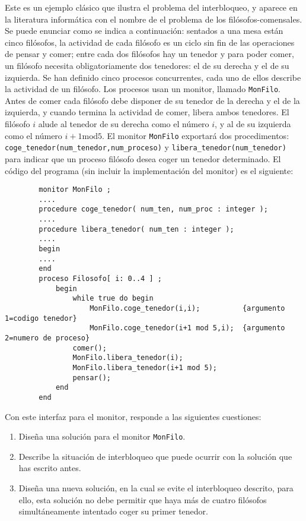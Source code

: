 \begin{ejercicio}
    Este es un ejemplo clásico que ilustra el problema del interbloqueo, y aparece en la literatura informática con el nombre de el problema de los filósofos-comensales. Se puede enunciar como se indica a continuación: sentados a una mesa están cinco filósofos, la actividad de cada filósofo es un ciclo sin fin de las operaciones de pensar y comer; entre cada dos filósofos hay un tenedor y para poder comer, un filósofo necesita obligatoriamente dos tenedores: el de su derecha y el de su izquierda. Se han definido cinco procesos concurrentes, cada uno de ellos describe la actividad de un filósofo. Los procesos usan un monitor, llamado \verb|MonFilo|. Antes de comer cada filósofo debe disponer de su tenedor de la derecha y el de la izquierda, y cuando termina la actividad de comer, libera ambos tenedores. El filósofo $i$ alude al tenedor de su derecha como el número $i$, y al de su izquierda como el número $i + 1 \text{mod} 5$. El monitor \verb|MonFilo| exportará dos procedimentos: \verb|coge_tenedor(num_tenedor,num_proceso)| y \verb|libera_tenedor(num_tenedor)| para indicar que un proceso filósofo desea coger un tenedor determinado. El código del programa (sin incluir la implementación del monitor) es el siguiente:
    \begin{verbatim}
        monitor MonFilo ;
        ....
        procedure coge_tenedor( num_ten, num_proc : integer );
        ....
        procedure libera_tenedor( num_ten : integer );
        ....
        begin
        ....
        end
        proceso Filosofo[ i: 0..4 ] ;
            begin
                while true do begin
                    MonFilo.coge_tenedor(i,i);          {argumento 1=codigo tenedor}
                    MonFilo.coge_tenedor(i+1 mod 5,i);  {argumento 2=numero de proceso}
                comer();
                MonFilo.libera_tenedor(i);
                MonFilo.libera_tenedor(i+1 mod 5);
                pensar();
            end
        end
    \end{verbatim}

    Con este interfaz para el monitor, responde a las siguientes cuestiones:
    \begin{enumerate}
        \item Diseña una solución para el monitor \verb|MonFilo|.
        \item Describe la situación de interbloqueo que puede ocurrir con la solución que has escrito antes.
        \item Diseña una nueva solución, en la cual se evite el interbloqueo descrito, para ello, esta solución no debe permitir que haya más de cuatro filósofos simultáneamente intentado coger su primer tenedor.
    \end{enumerate}


\end{ejercicio}

